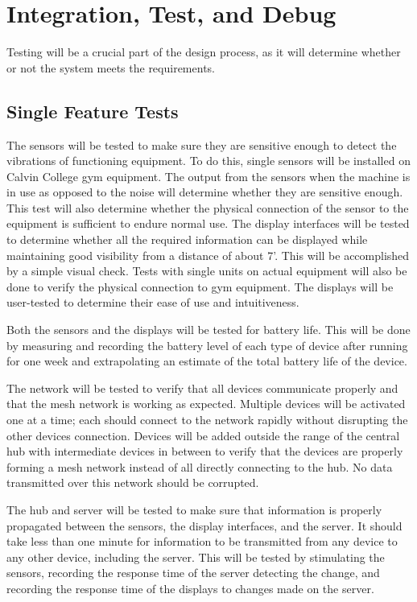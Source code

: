 \documentclass[PPFS.tex]{template/subfiles}
\begin{document}
\section{Integration, Test, and Debug}
Testing will be a crucial part of the design process, as it will determine whether or not the system meets the requirements.

\subsection{Single Feature Tests}
The sensors will be tested to make sure they are sensitive enough to detect the vibrations of functioning equipment.  To do this, single sensors will be installed on Calvin College gym equipment. The output from the sensors when the machine is in use as opposed to the noise will determine whether they are sensitive enough. This test will also determine whether the physical connection of the sensor to the equipment is sufficient to endure normal use.
The display interfaces will be tested to determine whether all the required information can be displayed while maintaining good visibility from a distance of about 7'. This will be accomplished by a simple visual check. Tests with single units on actual equipment will also be done to verify the physical connection to gym equipment. The displays will be user-tested to determine their ease of use and intuitiveness.

Both the sensors and the displays will be tested for battery life. This will be done by measuring and recording the battery level of each type of device after running for one week and extrapolating an estimate of the total battery life of the device.

The network will be tested to verify that all devices communicate properly and that the mesh network is working as expected. Multiple devices will be activated one at a time; each should connect to the network rapidly without disrupting the other devices connection. Devices will be added outside the range of the central hub with intermediate devices in between to verify that the devices are properly forming a mesh network instead of all directly connecting to the hub. No data transmitted over this network should be corrupted.

The hub and server will be tested to make sure that information is properly propagated between the sensors, the display interfaces, and the server. It should take less than one minute for information to be transmitted from any device to any other device, including the server. This will be tested by stimulating the sensors, recording the response time of the server detecting the change, and recording the response time of the displays to changes made on the server.
\end{document}

